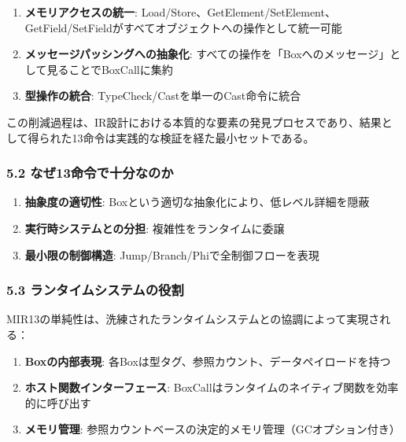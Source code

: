 \documentclass[
]{article}
\providecommand{\tightlist}{%
  \setlength{\itemsep}{0pt}\setlength{\parskip}{0pt}}
\begin{document}
\begin{enumerate}
\def\labelenumi{\arabic{enumi}.}
\tightlist
\item
  \textbf{メモリアクセスの統一}:
  Load/Store、GetElement/SetElement、GetField/SetFieldがすべてオブジェクトへの操作として統一可能
\item
  \textbf{メッセージパッシングへの抽象化}:
  すべての操作を「Boxへのメッセージ」として見ることでBoxCallに集約
\item
  \textbf{型操作の統合}: TypeCheck/Castを単一のCast命令に統合
\end{enumerate}

この削減過程は、IR設計における本質的な要素の発見プロセスであり、結果として得られた13命令は実践的な検証を経た最小セットである。

\hypertarget{ux306aux305c13ux547dux4ee4ux3067ux5341ux5206ux306aux306eux304b}{%
\subsubsection{5.2
なぜ13命令で十分なのか}\label{ux306aux305c13ux547dux4ee4ux3067ux5341ux5206ux306aux306eux304b}}

\begin{enumerate}
\def\labelenumi{\arabic{enumi}.}
\tightlist
\item
  \textbf{抽象度の適切性}:
  Boxという適切な抽象化により、低レベル詳細を隠蔽
\item
  \textbf{実行時システムとの分担}: 複雑性をランタイムに委譲
\item
  \textbf{最小限の制御構造}: Jump/Branch/Phiで全制御フローを表現
\end{enumerate}

\hypertarget{ux30e9ux30f3ux30bfux30a4ux30e0ux30b7ux30b9ux30c6ux30e0ux306eux5f79ux5272}{%
\subsubsection{5.3
ランタイムシステムの役割}\label{ux30e9ux30f3ux30bfux30a4ux30e0ux30b7ux30b9ux30c6ux30e0ux306eux5f79ux5272}}

MIR13の単純性は、洗練されたランタイムシステムとの協調によって実現される：

\begin{enumerate}
\def\labelenumi{\arabic{enumi}.}
\tightlist
\item
  \textbf{Boxの内部表現}:
  各Boxは型タグ、参照カウント、データペイロードを持つ
\item
  \textbf{ホスト関数インターフェース}:
  BoxCallはランタイムのネイティブ関数を効率的に呼び出す
\item
  \textbf{メモリ管理}:
  参照カウントベースの決定的メモリ管理（GCオプション付き）
\end{enumerate}
\end{document}
